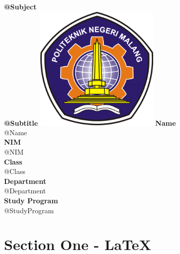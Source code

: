 \documentclass[12pt,titlepage]{article}
\makeatletter
\newcommand{\vSubject}{@Subject}
\newcommand{\vSubtitle}{@Subtitle}
\newcommand{\vName}{@Name}
\newcommand{\vNIM}{@NIM}
\newcommand{\vClass}{@Class}
\newcommand{\vDepartment}{@Department}
\newcommand{\vStudyProgram}{@StudyProgram}
\makeatother
\begin{document}
\begin{titlepage}
    \centering
    \vfill
    {\bfseries\LARGE
        \vSubject\\
        \vskip0.25cm
        \vSubtitle
    }
    \vfill
    \includegraphics[width=6cm]{images/polinema-logo.png}
    \vfill
    {
        \textbf{Name}\\
        \vName\\
        \vskip0.5cm
        \textbf{NIM}\\
        \vNIM\\
        \vskip0.5cm
        \textbf{Class}\\
        \vClass\\
        \vskip0.5cm
        \textbf{Department}\\
        \vDepartment\\
        \vskip0.5cm
        \textbf{Study Program}\\
        \vStudyProgram
    }
\end{titlepage}

\section{Section One - \LaTeX}
\end{document}
